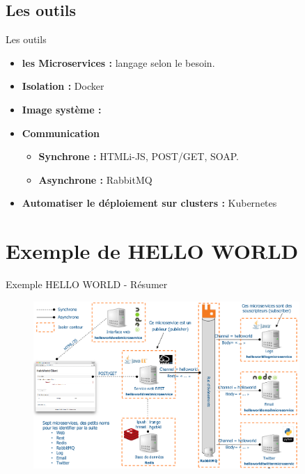 \documentclass{beamer}
\begin{document}
\subsection{Les outils}
\begin{frame}{Les outils}
    \begin{itemize}
        \item \textbf{les Microservices : } langage selon le besoin.
        \item \textbf{Isolation :} Docker
        \item \textbf{Image système : } \href{https://hub.docker.com/}{}
        \item \textbf{Communication } 
            \begin{itemize}
                \item \textbf{Synchrone : } HTMLi-JS, POST/GET, SOAP.
                \item \textbf{Asynchrone : } RabbitMQ
            \end{itemize}
        \item \textbf{Automatiser le déploiement sur clusters :} Kubernetes 
    \end{itemize}
\end{frame}
\section{Exemple de HELLO WORLD}
\begin{frame}{Exemple HELLO WORLD - Résumer }   
         \begin{figure}
            \begin{center}
                \includegraphics[width=0.9\textwidth]{hello.png}
            \end{center}
        \end{figure}
\end{frame}
\end{document}
